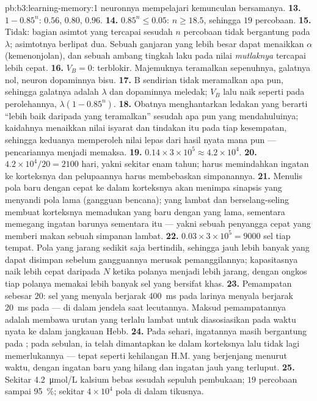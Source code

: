 \begin{solution}{pb:b3:learning-memory:1}
neuronnya mempelajari kemunculan bersamanya.
\textbf{13.} $1 - 0.85^{n}$: $0.56$, $0.80$, $0.96$.
\textbf{14.} $0.85^{n} \le 0.05$: $n \ge 18.5$, sehingga $19$ percobaan.
\textbf{15.} Tidak: bagian asimtot yang tercapai sesudah $n$ percobaan tidak
bergantung pada $\lambda$; asimtotnya berlipat dua. Sebuah ganjaran yang lebih besar dapat
menaikkan $\alpha$ (kemenonjolan), dan sebuah ambang tingkah laku pada nilai
\emph{mutlaknya} tercapai lebih cepat.
\textbf{16.} $V_{B} = 0$: terblokir. Majemuknya teramalkan sepenuhnya,
galatnya nol, neuron dopaminnya bisu.
\textbf{17.} B sendirian tidak meramalkan apa pun, sehingga galatnya adalah $\lambda$ dan
dopaminnya meledak; $V_{B}$ lalu naik seperti pada perolehannya, $\lambda(1 -
0.85^{n})$.
\textbf{18.} Obatnya menghantarkan ledakan yang berarti ``lebih baik daripada yang
teramalkan'' sesudah apa pun yang mendahuluinya; kaidahnya menaikkan nilai
isyarat dan tindakan itu pada tiap kesempatan, sehingga keduanya memperoleh nilai
lepas dari hasil nyata mana pun --- pencariannya menjadi memaksa.
\textbf{19.} $0.14\times 3\times 10^{5} \approx 4.2\times 10^{4}$.
\textbf{20.} $4.2\times 10^{4}/20 = 2100$ hari, yakni sekitar enam tahun;
 harus memindahkan ingatan ke korteksnya dan pelupaannya harus
membebaskan simpanannya.
\textbf{21.} Menulis pola baru dengan cepat ke dalam korteksnya akan menimpa
sinapsis yang menyandi pola lama (gangguan bencana);  yang
lambat dan berselang-seling membuat korteksnya memadukan yang baru dengan yang lama,
sementara  memegang ingatan barunya sementara itu --- yakni sebuah penyangga cepat
yang memberi makan sebuah simpanan lambat.
\textbf{22.} $0.03\times 3\times 10^{5} = 9000$ sel tiap tempat. Pola
yang jarang sedikit saja bertindih, sehingga jauh lebih banyak yang dapat disimpan sebelum
gangguannya merusak pemanggilannya; kapasitasnya naik lebih cepat daripada $N$ ketika
polanya menjadi lebih jarang, dengan ongkos tiap polanya memakai lebih banyak sel
yang bersifat khas.
\textbf{23.} Pemampatan sebesar $20$: sel yang menyala berjarak \qty{400}{ms} pada
larinya menyala berjarak \qty{20}{ms} pada  --- di dalam jendela saat
lecutannya. Maksud pemampatannya adalah membawa urutan yang terlalu lambat untuk
diasosiasikan pada waktu nyata ke dalam jangkauan Hebb.
\textbf{24.} Pada sehari, ingatannya masih bergantung pada ; pada
sebulan, ia telah dimantapkan ke dalam korteksnya lalu tidak lagi memerlukannya
--- tepat seperti kehilangan H.M. yang berjenjang menurut waktu, dengan ingatan baru yang hilang dan
ingatan jauh yang terluput.
\textbf{25.} Sekitar \qty{4.2}{\micro mol/L} kalsium bebas sesudah sepuluh
pembukaan; $19$ percobaan sampai \qty{95}{\%}; sekitar $4\times 10^{4}$ pola
di dalam  tikusnya.
\end{solution}
